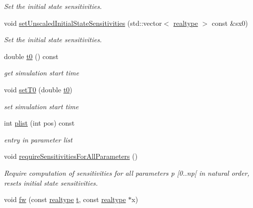 \begin{DoxyCompactItemize}
\begin{DoxyCompactList}\small\item\em Set the initial state sensitivities. \end{DoxyCompactList}\item 
void \mbox{\hyperlink{classamici_1_1_model_a55c3dcaac3e24e7b6ec3a80c7f148ed6}{set\+Unscaled\+Initial\+State\+Sensitivities}} (std\+::vector$<$ \mbox{\hyperlink{namespaceamici_a1bdce28051d6a53868f7ccbf5f2c14a3}{realtype}} $>$ const \&sx0)
\begin{DoxyCompactList}\small\item\em Set the initial state sensitivities. \end{DoxyCompactList}\item 
double \mbox{\hyperlink{classamici_1_1_model_a223e567004c82b5facc2fe98cdd16855}{t0}} () const
\begin{DoxyCompactList}\small\item\em get simulation start time \end{DoxyCompactList}\item 
void \mbox{\hyperlink{classamici_1_1_model_aaf5053fde7e205c89d89c000a7693987}{set\+T0}} (double \mbox{\hyperlink{classamici_1_1_model_a223e567004c82b5facc2fe98cdd16855}{t0}})
\begin{DoxyCompactList}\small\item\em set simulation start time \end{DoxyCompactList}\item 
int \mbox{\hyperlink{classamici_1_1_model_a6ac0de1b7dfddbb4a480657f62573563}{plist}} (int pos) const
\begin{DoxyCompactList}\small\item\em entry in parameter list \end{DoxyCompactList}\item 
\mbox{\label{classamici_1_1_model_a9b03cc8dbac85d38ced3f59234ba27d9}} 
void \mbox{\hyperlink{classamici_1_1_model_a9b03cc8dbac85d38ced3f59234ba27d9}{require\+Sensitivities\+For\+All\+Parameters}} ()
\begin{DoxyCompactList}\small\item\em Require computation of sensitivities for all parameters p \mbox{[}0..np\mbox{[} in natural order, resets initial state sensitivities. \end{DoxyCompactList}\item 
void \mbox{\hyperlink{classamici_1_1_model_a7e63009c65fc1361cc5a6e1fc3d5ff1a}{fw}} (const \mbox{\hyperlink{namespaceamici_a1bdce28051d6a53868f7ccbf5f2c14a3}{realtype}} \mbox{\hyperlink{classamici_1_1_model_a711281d57e9710226face29151cc4641}{t}}, const \mbox{\hyperlink{namespaceamici_a1bdce28051d6a53868f7ccbf5f2c14a3}{realtype}} $\ast$x)

\end{DoxyCompactItemize}

